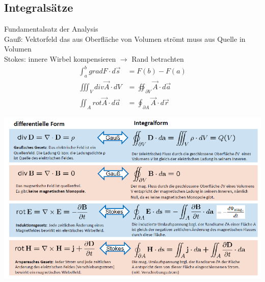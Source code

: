 \subsection{Integralsätze}
Fundamentalsatz der Analysis\\
Gauß: Vektorfeld das aus Oberfläche von Volumen strömt muss aus Quelle in Volumen\\
Stokes: innere Wirbel kompensieren $\rightarrow$ Rand betrachten 
\begin{align*}
    \int_{a}^b grad F \cdot d \vec{s} & = F(b) - F(a)\\
    \iiint_V div \vec{A} \cdot dV & = \oiint_{ \partial V} \vec{A} \cdot d \vec{a}\\
    \iint_{A} rot \vec{A} \cdot d \vec{a} & = \oint_{ \partial A} \vec{A} \cdot d \vec{r}
\end{align*}

\includegraphics[width=\columnwidth]{Figures/Integralsatz.png}


